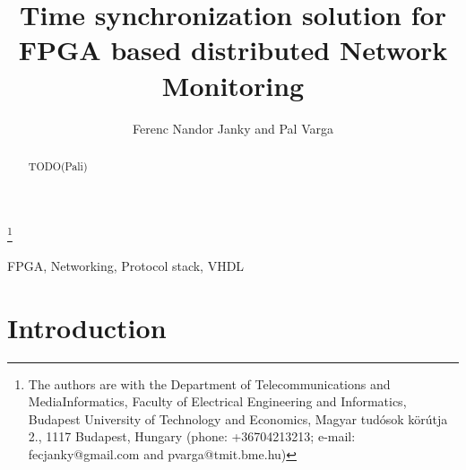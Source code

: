 \documentclass[journal]{IEEEtran}
\begin{document}
%
\title{Time synchronization solution for FPGA based distributed Network Monitoring}%
%
\author{Ferenc Nandor Janky and Pal Varga}%
%
\thanks{The authors are with the Department of Telecommunications and %
MediaInformatics, Faculty of Electrical Engineering and Informatics, %
Budapest University of Technology and Economics, %
Magyar tudósok körútja 2., 1117 Budapest, Hungary (phone: +36704213213; e-mail: fecjanky@gmail.com and pvarga@tmit.bme.hu)}%
%
%
\maketitle%
%
\begin{abstract}%
    \boldmath%
    TODO(Pali)%
\end{abstract}%
%
\begin{IEEEkeywords}%
    FPGA, Networking, Protocol stack, VHDL%
\end{IEEEkeywords}%
%
\section{Introduction}\label{sec:Intro}
\end{document}
